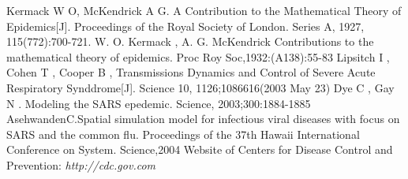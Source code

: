 \begin{thebibliography}{99}

	Kermack W O, McKendrick A G. A Contribution to the Mathematical Theory of Epidemics[J]. Proceedings of the Royal Society of London. Series A, 1927, 115(772):700-721.
	W. O. Kermack , A. G. McKendrick   Contributions to the mathematical theory of epidemics. Proc Roy Soc,1932:(A138):55-83
	Lipsitch I , Cohen T , Cooper B , Transmissions Dynamics and Control of Severe Acute Respiratory Synddrome[J]. Science 10, 1126;1086616(2003 May 23)
	Dye C , Gay N . Modeling the SARS epedemic. Science, 2003;300:1884-1885
	AsehwandenC.Spatial simulation model for infectious viral diseases with focus on SARS and the common flu. Proceedings of the 37th Hawaii International Conference on System. Science,2004
	Website of Centers for Disease Control and Prevention: \emph{http://cdc.gov.com}
\end{thebibliography}